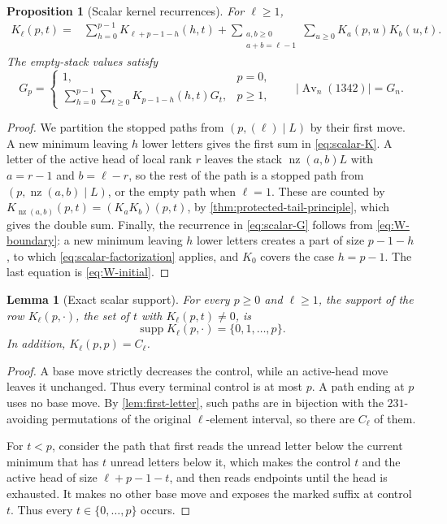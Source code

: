 \documentclass[11pt,reqno]{amsart}
\newtheorem{proposition}[proposition]{Proposition}
\newtheorem{lemma}[lemma]{Lemma}
\theoremstyle{definition}
\theoremstyle{remark}
\newcommand{\Av}{\operatorname{Av}}
\newcommand{\nz}{\operatorname{nz}}
\newcommand{\supp}{\operatorname{supp}}
\begin{document}
\begin{proposition}[Scalar kernel recurrences]
\label{prop:scalar-kernel-recurrence}
For $\ell\geq1$,
\begin{align}
K_\ell(p,t)={}&\sum_{h=0}^{p-1}K_{\ell+p-1-h}(h,t)
 +\sum_{\substack{a,b\geq0\\a+b=\ell-1}}
  \sum_{u\geq0}K_a(p,u)K_b(u,t). \label{eq:scalar-K}
\end{align}
The empty-stack values satisfy
\begin{equation}\label{eq:scalar-G}
 G_p=
 \begin{cases}
  1,&p=0,\\
  \sum_{h=0}^{p-1}\sum_{t\geq0}K_{p-1-h}(h,t)G_t,&p\geq1,
 \end{cases}
 \qquad \lvert\Av_n(1342)\rvert=G_n.
\end{equation}
\end{proposition}

\begin{proof}
We partition the stopped paths from $(p,(\ell)\mid L)$ by their first move.
A new minimum leaving $h$ lower letters gives the first sum in
\eqref{eq:scalar-K}.  A letter of the active head of local rank $r$ leaves
the stack $\nz(a,b)L$ with $a=r-1$ and $b=\ell-r$, so the rest of the path is
a stopped path from $(p,\nz(a,b)\mid L)$, or the empty path when
$\ell=1$.  These are counted by
$K_{\nz(a,b)}(p,t)=(K_aK_b)(p,t)$, by
\cref{thm:protected-tail-principle}, which gives the double sum.  Finally, the recurrence in \eqref{eq:scalar-G}
follows from \eqref{eq:W-boundary}: a new minimum leaving $h$ lower letters
creates a part of size $p-1-h$, to which \eqref{eq:scalar-factorization}
applies, and $K_0$ covers the case $h=p-1$.  The last equation is
\eqref{eq:W-initial}.
\end{proof}

\begin{lemma}[Exact scalar support]\label{lem:scalar-support}
For every $p\geq0$ and $\ell\geq1$, the support of the row
$K_\ell(p,\mathord\cdot)$, the set of $t$ with $K_\ell(p,t)\neq0$, is
\begin{equation}\label{eq:scalar-support}
 \supp K_\ell(p,\mathord\cdot)=\{0,1,\ldots,p\}.
\end{equation}
In addition, $K_\ell(p,p)=C_\ell$.
\end{lemma}

\begin{proof}
A base move strictly decreases the control, while an active-head move leaves it
unchanged.  Thus every terminal control is at most $p$.  A path ending at
$p$ uses no base move.  By \cref{lem:first-letter}, such paths are in
bijection with the $231$-avoiding permutations of the original
$\ell$-element interval, so there are $C_\ell$ of them.

For $t<p$, consider the path that first reads the unread letter below the
current minimum that has $t$ unread letters below it, which makes the
control $t$ and the active head of size $\ell+p-1-t$, and then reads
endpoints until the head is exhausted.  It makes no other base move and
exposes the marked suffix at control $t$.  Thus every $t\in\{0,\ldots,p\}$ occurs.
\end{proof}
\end{document}
